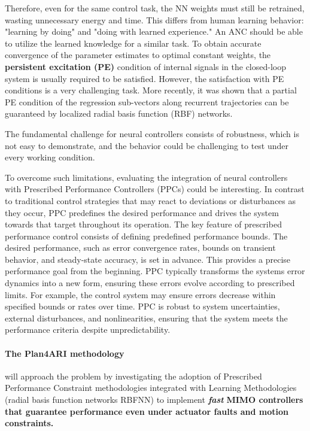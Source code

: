 Therefore, even for the same control task, the NN weights must still be
retrained, wasting unnecessary energy and time. This differs from human
learning behavior: "learning by doing" and "doing with learned
experience." An ANC should be able to utilize the learned knowledge for
a similar task. To obtain accurate convergence of the parameter
estimates to optimal constant weights, the \textbf{persistent excitation
(PE)} condition of internal signals in the closed-loop system is usually
required to be satisfied. However, the satisfaction with PE conditions
is a very challenging task. More recently, it was shown that a partial
PE condition of the regression sub-vectors along recurrent trajectories
can be guaranteed by localized radial basis function (RBF) networks.

The fundamental challenge for neural controllers consists of robustness,
which is not easy to demonstrate, and the behavior could be challenging
to test under every working condition.

To overcome such limitations, evaluating the integration of neural
controllers with Prescribed Performance Controllers (PPCs) could be
interesting. In contrast to traditional control strategies that may
react to deviations or disturbances as they occur, PPC predefines the
desired performance and drives the system towards that target throughout
its operation. The key feature of prescribed performance control
consists of defining predefined performance bounds. The desired
performance, such as error convergence rates, bounds on transient
behavior, and steady-state accuracy, is set in advance. This provides a
precise performance goal from the beginning. PPC typically transforms
the system\textquotesingle s error dynamics into a new form, ensuring
these errors evolve according to prescribed limits. For example, the
control system may ensure errors decrease within specified bounds or
rates over time. PPC is robust to system uncertainties, external
disturbances, and nonlinearities, ensuring that the system meets the
performance criteria despite unpredictability.

\paragraph{The Plan4ARI methodology}\label{the-plan4ari-methodology-2}

 will approach the problem by investigating the
adoption of Prescribed Performance Constraint methodologies integrated
with Learning Methodologies (radial basis function networks RBFNN) to
implement \emph{\textbf{fast}} \textbf{MIMO controllers that guarantee
performance even under actuator faults and motion constraints.}

